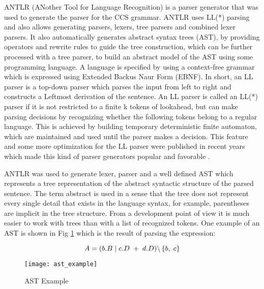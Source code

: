 ANTLR (ANother Tool for Language Recognition) \cite{ANTLRRef} is a parser generator that was used 
to generate the parser for the CCS grammar. ANTLR uses LL(*) parsing and also allows generating 
parsers, lexers, tree parsers and combined lexer parsers. It also automatically generates 
abstract syntax trees (AST), by providing operators and rewrite rules to guide the tree construction,
which can be further processed with a tree parser, to build an abstract model of the AST using some programming language.
A language is specified by using a context-free
grammar which is expressed using Extended Backus Naur Form (EBNF). In short, an LL parser is a 
top-down parser which parses the input from left to right and constructs a Leftmost derivation 
of the sentence. An LL parser is called an LL(*) parser if it is not restricted to a finite k 
tokens of lookahead, but can make parsing decisions by recognizing whether the following tokens
belong to a regular language. This is achieved by building temporary deterministic finite
automaton, which are maintained and used until the parser makes a decision. This feature and
some more optimization for the LL parser were published in recent years which made this kind 
of parser generators popular and favorable \cite{NiklausWirth}.

ANTLR was used to generate lexer, parser and a well defined AST which represents a tree representation 
of the abstract syntactic structure of the parsed sentence. The term abstract is used in a sense 
that the tree does not represent every single detail that exists in the language syntax, 
for example, parentheses are implicit in the tree structure. 
From a development point of view it is much easier to work with trees than with a list of recognized
tokens. One example of an AST is shown in  Fig \ref{fig:ast_example} which is the result of parsing the expression: 

\begin{equation}\label{eq:ccs_example}
 A=( b.B \hspace{1 mm} | \hspace{1 mm} c.D \hspace{1 mm} + \hspace{1 mm} d.D )
\backslash \left\lbrace b, \hspace{1 mm} c \right\rbrace 
\end{equation}

\begin{figure}[!t]
\centering
\texttt{[image: ast\_example]}
\caption{AST Example}
\label{fig:ast_example}
\end{figure}

